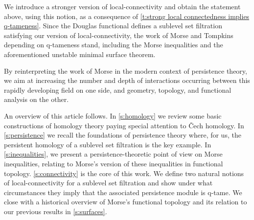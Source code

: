 We introduce a stronger version of local-connectivity and obtain the statement above, using this notion, as a consequence of \cref{t:strong local connectedness implies q-tameness}.
Since the Douglas functional defines a sublevel set filtration satisfying our version of local-connectivity, the work of Morse and Tompkins depending on q-tameness stand, including the Morse inequalities and the aforementioned unstable minimal surface theorem.

By reinterpreting the work of Morse in the modern context of persistence theory, we aim at increasing the number and depth of interactions occurring between this rapidly developing field on one side, and geometry, topology, and functional analysis on the other.

An overview of this article follows.
In \cref{s:homology} we review some basic constructions of homology theory paying special attention to \v{C}ech homology.
In \cref{s:persistence} we recall the foundations of persistence theory where, for us, the persistent homology of a sublevel set filtration is the key example.
In \cref{s:inequalities}, we present a persistence-theoretic point of view on Morse inequalities, relating to Morse's version of these inequalities in functional topology.
\cref{s:connectivity} is the core of this work.
We define two natural notions of local-connectivity for a sublevel set filtration and show under what circumstances they imply that the associated persistence module is q-tame.
We close with a historical overview of Morse's functional topology and its relation to our previous results in \cref{s:surfaces}.